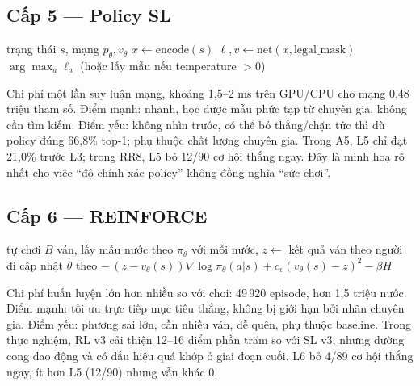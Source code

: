 \subsection{Cấp 5 --- Policy SL}
\begin{algorithm}[H]
  \caption{PolicyAgent}
  \begin{algorithmic}[1]
    \REQUIRE trạng thái $s$, mạng $p_\theta, v_\theta$
    \STATE $x \leftarrow \text{encode}(s)$
    \STATE $\ell, v \leftarrow \text{net}(x, \text{legal\_mask})$
    \RETURN $\arg\max_a \ell_a$ (hoặc lấy mẫu nếu temperature $>0$)
  \end{algorithmic}
\end{algorithm}
Chi phí một lần suy luận mạng, khoảng 1,5--2 ms trên GPU/CPU cho mạng 0,48 triệu tham số. Điểm
mạnh: nhanh, học được mẫu phức tạp từ chuyên gia, không cần tìm kiếm. Điểm yếu: không nhìn
trước, có thể bỏ thắng/chặn tức thì dù policy đúng 66,8\% top-1; phụ thuộc chất lượng chuyên
gia. Trong A5, L5 chỉ đạt 21,0\% trước L3; trong RR8, L5 bỏ 12/90 cơ hội thắng ngay. Đây là
minh hoạ rõ nhất cho việc ``độ chính xác policy'' không đồng nghĩa ``sức chơi''.

\subsection{Cấp 6 --- REINFORCE}
\begin{algorithm}[H]
  \caption{REINFORCE có baseline}
  \begin{algorithmic}[1]
      \STATE tự chơi $B$ ván, lấy mẫu nước theo $\pi_\theta$
      \STATE với mỗi nước, $z \leftarrow$ kết quả ván theo người đi
      \STATE cập nhật $\theta$ theo $-\,(z-v_\theta(s))\nabla\log\pi_\theta(a|s) + c_v(v_\theta(s)-z)^2 - \beta H$
    \ENDFOR
  \end{algorithmic}
\end{algorithm}
Chi phí huấn luyện lớn hơn nhiều so với chơi: 49\,920 episode, hơn 1,5 triệu nước. Điểm mạnh:
tối ưu trực tiếp mục tiêu thắng, không bị giới hạn bởi nhãn chuyên gia. Điểm yếu: phương sai
lớn, cần nhiều ván, dễ quên, phụ thuộc baseline. Trong thực nghiệm, RL v3 cải thiện 12--16 điểm
phần trăm so với SL v3, nhưng đường cong dao động và có dấu hiệu quá khớp ở giai đoạn cuối. L6
bỏ 4/89 cơ hội thắng ngay, ít hơn L5 (12/90) nhưng vẫn khác 0.

